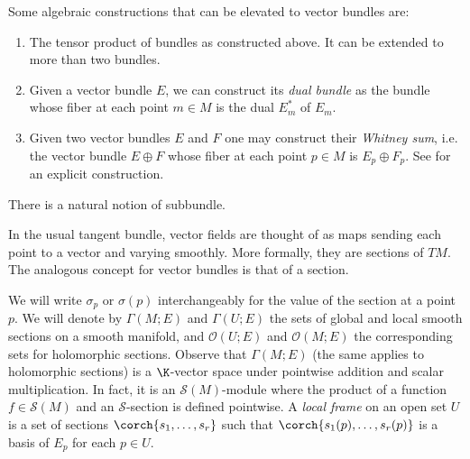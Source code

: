 \begin{example} \label{ex_vector_bundle_constructions}
    Some algebraic constructions that can be elevated to vector bundles are:
    \begin{enumerate}
    \item The tensor product of bundles as constructed above. It can be extended to more than two bundles. 
    \item Given a vector bundle \(E\), we can construct its \textit{dual bundle} as the bundle whose fiber at each point \(m \in M\) is the dual \(E_m^* \) of \(E_m\).
    \item Given two vector bundles \(E\) and \(F\) one may construct their \textit{Whitney sum}, i.e. the vector bundle \(E \oplus F\) whose fiber at each point \(p \in M\) is \(E_p \oplus F_p\). See \parencite[Example 10.7]{lee_introSM} for an explicit construction.
    \end{enumerate}
\end{example}
There is a natural notion of subbundle.


In the usual tangent bundle, vector fields are thought of as maps sending each point to a vector and varying smoothly. More formally, they are sections of \(TM\). The analogous concept for vector bundles is that of a section.

We will write \(\sigma_p\) or \(\sigma(p)\) interchangeably for the value of the section at a point \(p\). We will denote by \(\Gamma(M;E)\) and \(\Gamma(U;E)\) the sets of global and local smooth sections on a smooth manifold, and \(\mathcal{O}(U;E)\) and \(\mathcal{O}(M;E)\) the corresponding sets for holomorphic sections. Observe that \(\Gamma(M;E)\) (the same applies to holomorphic sections) is a \(\K\)-vector space under pointwise addition and scalar multiplication. In fact, it is an \(\mathcal{S}(M)\)-module where the product of a function \(f \in \mathcal{S}(M)\) and an \(\mathcal{S}\)-section is defined pointwise. A \textit{local frame} on an open set \(U\) is a set of sections \(\corch{s_1, \ldots, s_r}\) such that \(\corch{s_1(p), \ldots, s_r(p)}\) is a basis of \(E_p\) for each \(p \in U\).


